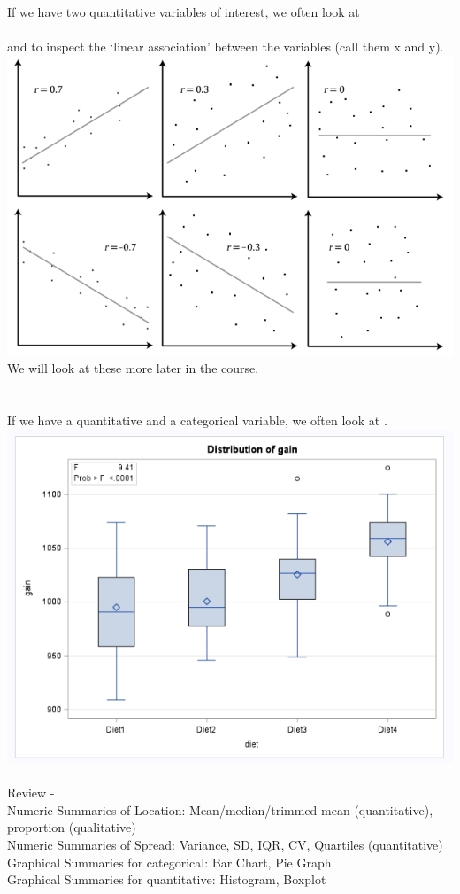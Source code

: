 If we have two quantitative variables of interest, we often look at \underbar{~~~~~~~~~~~~~~~~~~~~~~~~~~~~~~~~~~~~~~~~~~~~~~~~~~~~~} \\~\\
and \underbar{~~~~~~~~~~~~~~~~~~~~~~~~~~~~~~~~~~~~~~~~~~~~~~~~~~~~~} to inspect the `linear association' between the variables (call them x and y).\\
\includegraphics[scale=0.6]{scatterplots}\\
We will look at these more later in the course.\\~\\~\\
If we have a quantitative and a categorical variable, we often look at \underbar{~~~~~~~~~~~~~~~~~~~~~~~~~~~~~~~~~~~~~~~~~~~~~~~~~~~~~}.\\
\includegraphics[scale=0.6]{ChickensBoxPlot}\\~\\
Review - \\
Numeric Summaries of Location: Mean/median/trimmed mean (quantitative), proportion (qualitative)\\
Numeric Summaries of Spread: Variance, SD, IQR, CV, Quartiles (quantitative)\\
Graphical Summaries for categorical: Bar Chart, Pie Graph\\
Graphical Summaries for quantitative: Histogram, Boxplot






